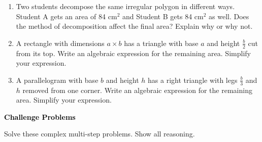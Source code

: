\documentclass[12pt, letterpaper, fleqn]{article}
\begin{document}
\begin{enumerate}[itemsep=2.3cm, leftmargin=0.6cm]

\item Two students decompose the same irregular polygon in different ways. Student A gets an area of 84 cm$^2$ and Student B gets 84 cm$^2$ as well. Does the method of decomposition affect the final area? Explain why or why not.

\vspace{2.2cm}

\item A rectangle with dimensions $a \times b$ has a triangle with base $a$ and height $\frac{b}{2}$ cut from its top. Write an algebraic expression for the remaining area. Simplify your expression.

\vspace{2.5cm}

\item A parallelogram with base $b$ and height $h$ has a right triangle with legs $\frac{b}{3}$ and $h$ removed from one corner. Write an algebraic expression for the remaining area. Simplify your expression.

\vspace{2.5cm}

\end{enumerate}

\newpage

\begin{tcolorbox}[colback=black!10]
\large\textcolor{black}{\textbf{Challenge Problems}}
\end{tcolorbox}

\noindent
Solve these complex multi-step problems. Show all reasoning.

\vspace{3mm}
\end{document}
